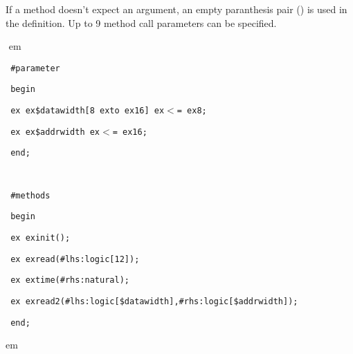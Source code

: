 \documentclass[a4paper,12pt,twoside,english]{article}
\def\s{\hskip 1.15 ex}
\begin{document}
\begin{description}
\begin{enumerate}
\end{enumerate}
If a method doesn't expect an argument, an empty paranthesis pair () is used in the definition. Up to 9 method call parameters can be specified.


\item[\colorit{\bf Example}]
\def\prefskipu{}\def\prefskipo{}\def\prefskipa{}\def\prefskipu{\hskip10pt}\def\prefskipo{\hskip10pt}\def\prefskipa{\hskip20pt}\def\content{
\vskip-5pt{\parindent0pt\parbox{\linewidth}{\tt\smallsize\hskip10pt \#parameter}}
\vskip-5pt{\parindent0pt\parbox{\linewidth}{\tt\smallsize\hskip10pt begin}}
\vskip-5pt{\parindent0pt\parbox{\linewidth}{\tt\smallsize\hskip10pt \s \s \$datawidth{[}8\s to\s 16{]}\s $<$=\s 8;}}
\vskip-5pt{\parindent0pt\parbox{\linewidth}{\tt\smallsize\hskip10pt \s \s \$addrwidth\s $<$=\s 16;}}
\vskip-5pt{\parindent0pt\parbox{\linewidth}{\tt\smallsize\hskip10pt end;}}
\vskip-5pt{\parindent0pt\parbox{\linewidth}{\tt\smallsize\hskip10pt }}
\vskip-5pt{\parindent0pt\parbox{\linewidth}{\tt\smallsize\hskip10pt \#methods}}
\vskip-5pt{\parindent0pt\parbox{\linewidth}{\tt\smallsize\hskip10pt begin}}
\vskip-5pt{\parindent0pt\parbox{\linewidth}{\tt\smallsize\hskip10pt \s \s init();}}
\vskip-5pt{\parindent0pt\parbox{\linewidth}{\tt\smallsize\hskip10pt \s \s read(\#lhs:logic{[}12{]});}}
\vskip-5pt{\parindent0pt\parbox{\linewidth}{\tt\smallsize\hskip10pt \s \s time(\#rhs:natural);}}
\vskip-5pt{\parindent0pt\parbox{\linewidth}{\tt\smallsize\hskip10pt \s \s read2(\#lhs:logic{[}\$datawidth{]},\#rhs:logic{[}\$addrwidth{]});}}
\vskip-5pt{\parindent0pt\parbox{\linewidth}{\tt\smallsize\hskip10pt end;}}
}
$ $
 em
\content
{} em

\end{description}

\vskip5pt



\def\thesubsubsection{\vrule width 0pt height 1.3 ex}
\end{document}
